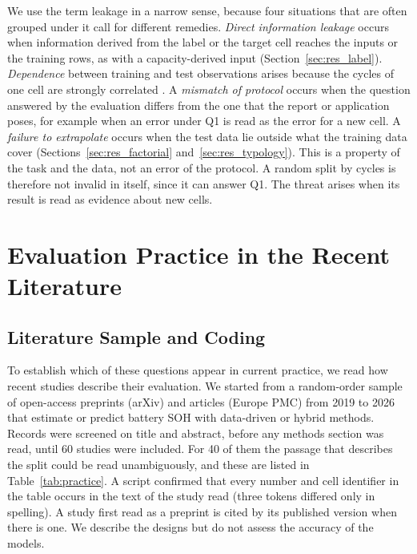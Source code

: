 \documentclass{ieeeaccess}
\begin{document}
We use the term leakage in a narrow sense, because four situations that are often grouped under it call for different remedies. \emph{Direct information leakage} occurs when information derived from the label or the target cell reaches the inputs or the training rows, as with a capacity-derived input (Section~\ref{sec:res_label}). \emph{Dependence} between training and test observations arises because the cycles of one cell are strongly correlated \cite{saeb2017,kaufman2012}. A \emph{mismatch of protocol} occurs when the question answered by the evaluation differs from the one that the report or application poses, for example when an error under Q1 is read as the error for a new cell. A \emph{failure to extrapolate} occurs when the test data lie outside what the training data cover (Sections~\ref{sec:res_factorial} and~\ref{sec:res_typology}). This is a property of the task and the data, not an error of the protocol. A random split by cycles is therefore not invalid in itself, since it can answer Q1. The threat arises when its result is read as evidence about new cells.

\section{Evaluation Practice in the Recent Literature}
\label{sec:practice}
\subsection{Literature Sample and Coding}
To establish which of these questions appear in current practice, we read how recent studies describe their evaluation. We started from a random-order sample of open-access preprints (arXiv) and articles (Europe PMC) from 2019 to 2026 that estimate or predict battery SOH with data-driven or hybrid methods. Records were screened on title and abstract, before any methods section was read, until 60 studies were included. For 40 of them the passage that describes the split could be read unambiguously, and these are listed in Table~\ref{tab:practice}. A script confirmed that every number and cell identifier in the table occurs in the text of the study read (three tokens differed only in spelling). A study first read as a preprint is cited by its published version when there is one. We describe the designs but do not assess the accuracy of the models.
\end{document}
